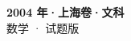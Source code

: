 \documentclass[zihao=-4, a4paper]{ctexart}
\begin{document}
\begin{center}
  {\Large\bfseries 2004 年·上海卷·文科}\\[4pt]
  {\large 数学 · 试题版}
\end{center}
\medskip
{}

\end{document}
